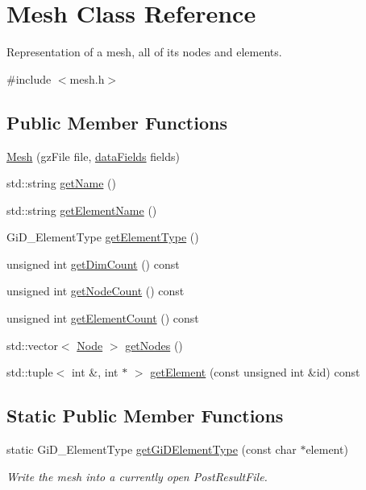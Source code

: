 \hypertarget{classMesh}{}\section{Mesh Class Reference}
\label{classMesh}


Representation of a mesh, all of its nodes and elements.  




{\ttfamily \#include $<$mesh.\+h$>$}

\subsection*{Public Member Functions}
\begin{DoxyCompactItemize}
\item 
\hyperlink{classMesh_a7648013c55e45a4cde14d75b14631751}{Mesh} (gz\+File file, \hyperlink{utilities_8h_a981a882ef2a0d7ee5b6b32f27105644e}{data\+Fields} fields)
\item 
std\+::string \hyperlink{classMesh_a7582c53a358e1f5f85c745e8845b45a2}{get\+Name} ()
\item 
std\+::string \hyperlink{classMesh_a59688b2769be829f3142662d5dec4855}{get\+Element\+Name} ()
\item 
Gi\+D\+\_\+\+Element\+Type \hyperlink{classMesh_aafbb679e494fcebacd811384bc3d9e29}{get\+Element\+Type} ()
\item 
unsigned int \hyperlink{classMesh_aded45a45edb90ce60215df2f69fdedac}{get\+Dim\+Count} () const
\item 
unsigned int \hyperlink{classMesh_a89191e32a7f1ab3206bc9ea88be42dda}{get\+Node\+Count} () const
\item 
unsigned int \hyperlink{classMesh_a9d0881d1942c4a0b8d08a4f440f1c3ea}{get\+Element\+Count} () const
\item 
std\+::vector$<$ \hyperlink{classNode}{Node} $>$ \hyperlink{classMesh_a9daa8d1054eabf200d152bba156a2ebe}{get\+Nodes} ()
\item 
std\+::tuple$<$ int \&, int $\ast$ $>$ \hyperlink{classMesh_a415ffa23e4dcb0c73b60557455e87b25}{get\+Element} (const unsigned int \&id) const
\end{DoxyCompactItemize}
\subsection*{Static Public Member Functions}
\begin{DoxyCompactItemize}
\item 
static Gi\+D\+\_\+\+Element\+Type \hyperlink{classMesh_aec161b91369a8f24ce2fa333547a7eef}{get\+Gi\+D\+Element\+Type} (const char $\ast$element)
\begin{DoxyCompactList}\small\item\em Write the mesh into a currently open Post\+Result\+File. \end{DoxyCompactList}\end{DoxyCompactItemize}
